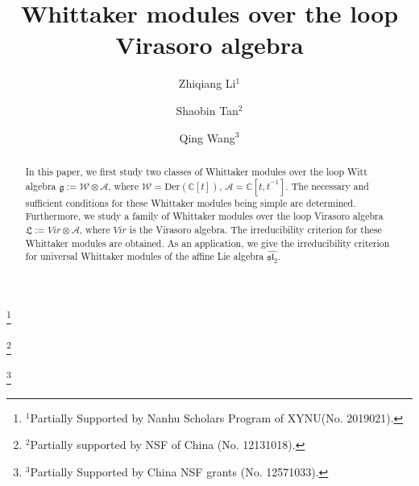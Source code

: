 \documentclass[12pt, a4paper]{amsart}
\newcommand{\fg}{\mathfrak g}
\newcommand{\C}{\mathbb{C}}
\theoremstyle{Theorem}
\theoremstyle{Theorem}
\numberwithin{equation}{section}
\begin{document}
\title[Whittaker modules over loop Virasoro algebra]{Whittaker modules over the loop Virasoro algebra}

\author{Zhiqiang Li$^1$}
\address{School of Mathematics and Statistics, Xinyang Normal University,
 Xinyang, China 464000} 
 \thanks{$^1$Partially Supported by Nanhu Scholars Program of
XYNU(No. 2019021).}

 \author{Shaobin Tan$^2$}
 \address{School of Mathematical Sciences, Xiamen University,
 Xiamen, China 361005} 
  \thanks{$^2$Partially supported by NSF of China (No. 12131018).}


\author{Qing Wang$^3$}
\address{School of Mathematical Sciences, Xiamen University,
 Xiamen, China 361005} 
 \thanks{$^3$Partially Supported by China NSF grants (No. 12571033).}





\maketitle

\begin{abstract}
In this paper, we first study two classes of Whittaker modules over the loop Witt algebra
$\fg:=\mathcal{W}\otimes\mathcal{A}$, where $\mathcal{W}=\text{Der}(\C[t])$, $\mathcal{A}=\C[t,t^{-1}]$. The necessary and sufficient conditions for these Whittaker modules being simple are determined.
Furthermore, we study a family of Whittaker modules
over the loop Virasoro algebra $\mathfrak{L}:=Vir\otimes\mathcal{A}$, where $Vir$ is the Virasoro algebra. The irreducibility criterion for these Whittaker modules are obtained. As an application,
we give the irreducibility criterion for universal Whittaker modules of the affine Lie algebra
$\widehat{\mathfrak{sl}_{2}}$.

\end{abstract}
\end{document}
